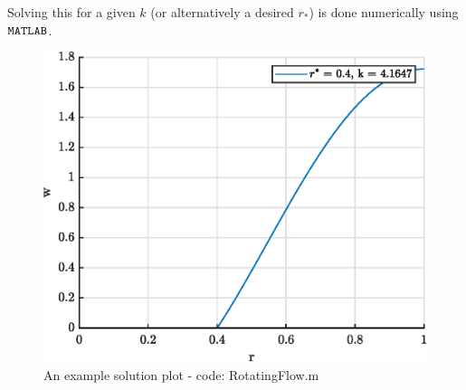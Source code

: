 \documentclass{X:/Documents/Coding/Latex/myreport}
\begin{document}






Solving this for a given $k$ (or alternatively a desired $r_*$) is done numerically using $\verb|MATLAB|$.

\begin{figure}[h]
    \centering
    \includegraphics[width=\linewidth]{Plots/exampleKRstar}
    \caption{An example solution plot - code: RotatingFlow.m}
    \label{fig:exampleKRstar}
\end{figure}
\end{document}
